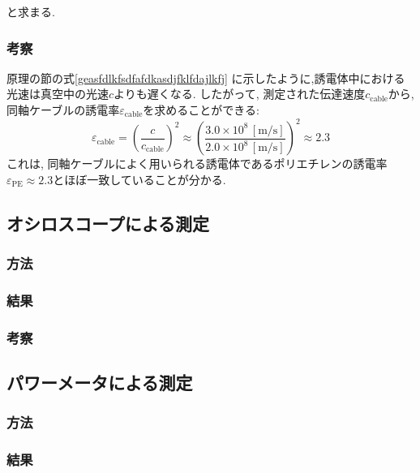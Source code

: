 \documentclass[uplatex,dvipdfmx,a4j,12pt]{jsarticle}
\begin{document}
と求まる.







\subsubsection{考察}


原理の節の式\ref{geasfdlkfsdfafdkasdjfklfdajlkfj} に示したように,誘電体中における光速は真空中の光速$c$よりも遅くなる.
したがって, 測定された伝達速度$c_\mathrm{cable}$から, 同軸ケーブルの誘電率$\varepsilon_\mathrm{cable}$を求めることができる:
\begin{equation}
  \varepsilon_\mathrm{cable} = \left(\frac{c}{c_\mathrm{cable}}\right)^2 \approx \left(\frac{3.0 \times 10^8\,\mathrm{[m/s]}}{2.0 \times 10^8\,\mathrm{[m/s]}}\right)^2 \approx 2.3
\end{equation}
これは, 同軸ケーブルによく用いられる誘電体であるポリエチレンの誘電率$\varepsilon_\mathrm{PE} \approx 2.3$とほぼ一致していることが分かる.



\subsection{オシロスコープによる測定}
\subsubsection{方法}

\subsubsection{結果}

\subsubsection{考察}

\subsection{パワーメータによる測定}
\subsubsection{方法}

\subsubsection{結果}
\end{document}
